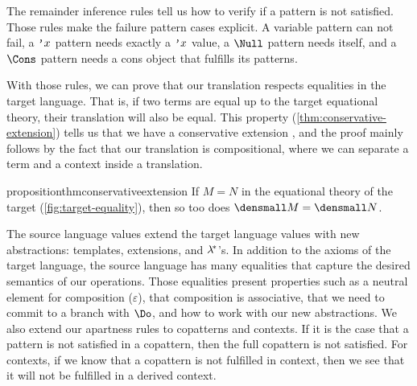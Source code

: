 The remainder inference rules tell us how to verify if a pattern is not satisfied.
Those rules make the failure pattern cases explicit.
A variable pattern can not fail, a $\text{\tt'}{x}$ pattern needs exactly a $\text{\tt'}{x}$ value, a $\Null$ pattern needs itself, and a $\Cons$ pattern needs a cons object that fulfills its patterns.


With those rules, we can prove that our translation respects equalities in the target language.
That is, if two terms are equal up to the target equational theory, their translation will also be equal.
This property (\cref{thm:conservative-extension}) tells us that we have a conservative extension \cite{ExpressivePower}, and the proof mainly follows by the fact that our translation is compositional, where we can separate a term and a context inside a translation.


\begin{restatable}{proposition}{thmconservativeextension}
  \label{thm:conservative-extension}
  If $M = N$ in the equational theory of the target
  (\cref{fig:target-equality}), then so too does $\den{M} = \den{N}$.
\end{restatable}

The source language values extend the target language values with new abstractions: templates, extensions, and $\lambda^{\!*}$'s.
In addition to the axioms of the target language, the source language has many equalities that capture the desired semantics of our operations. Those equalities present properties such as a neutral element for composition ($\varepsilon$), that composition is associative, that we need to commit to a branch with $\Do$, and how to work with our new abstractions.
We also extend our apartness rules to copatterns and contexts.
If it is the case that a pattern is not satisfied in a copattern, then the full copattern is not satisfied.
For contexts, if we know that a copattern is not fulfilled in context, then we see that it will not be fulfilled in a derived context.

